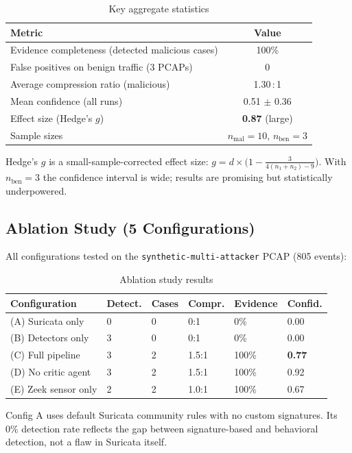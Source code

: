 \documentclass[11pt, a4paper]{article}
\begin{document}
\begin{table}[H]
\centering\small
\caption{Key aggregate statistics}
\label{tab:aggregate}
\begin{tabular}{@{} l c @{}}
\toprule
\textbf{Metric} & \textbf{Value} \\
\midrule
Evidence completeness (detected malicious cases) & 100\% \\
False positives on benign traffic (3 PCAPs)      & 0 \\
Average compression ratio (malicious)             & 1.30\,:\,1 \\
Mean confidence (all runs)                        & 0.51 $\pm$ 0.36 \\
Effect size (Hedge's $g$)                         & \textbf{0.87} (large) \\
Sample sizes                                      & $n_{\text{mal}} = 10$,\; $n_{\text{ben}} = 3$ \\
\bottomrule
\end{tabular}

\vspace{4pt}
\raggedright\footnotesize
Hedge's $g$ is a small-sample-corrected effect size: $g = d \times \bigl(1 - \tfrac{3}{4(n_1+n_2)-9}\bigr)$. With $n_{\text{ben}}=3$ the confidence interval is wide; results are promising but statistically underpowered.
\end{table}

\subsection{Ablation Study (5 Configurations)}

All configurations tested on the \texttt{synthetic-multi-attacker} PCAP (805 events):

\begin{table}[H]
\centering\small
\caption{Ablation study results}
\label{tab:ablation}
\begin{tabular}{@{} L{3.6cm} C{1.3cm} C{1cm} C{1.3cm} C{1.4cm} C{1.4cm} @{}}
\toprule
\textbf{Configuration} & \textbf{Detect.} & \textbf{Cases} & \textbf{Compr.} & \textbf{Evidence} & \textbf{Confid.} \\
\midrule
(A) Suricata only        & 0 & 0 & 0:1   & 0\%   & 0.00 \\
(B) Detectors only       & 3 & 0 & 0:1   & 0\%   & 0.00 \\
(C) Full pipeline        & 3 & 2 & 1.5:1 & 100\% & \textbf{0.77} \\
(D) No critic agent      & 3 & 2 & 1.5:1 & 100\% & 0.92 \\
(E) Zeek sensor only     & 2 & 2 & 1.0:1 & 100\% & 0.67 \\
\bottomrule
\end{tabular}

\vspace{4pt}
\raggedright\footnotesize
Config A uses default Suricata community rules with no custom signatures. Its 0\% detection rate reflects the gap between signature-based and behavioral detection, not a flaw in Suricata itself.
\end{table}
\end{document}
